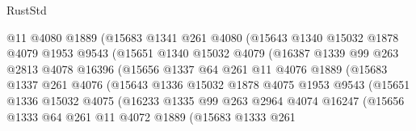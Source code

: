 \begin{lexlean}{RustStd}
\begin{coremodule}
                        @11
                        @4080
                        @1889
                        (@15683
                          @1341
                          @261
                          @4080
                          (@15643
                            @1340
                            @15032
                            @1878
                            @4079
                            @1953
                            @9543
                            (@15651
                              @1340
                              @15032
                              @4079
                              (@16387
                                @1339
                                @99
                                @263
                                @2813
                                @4078
                                @16396
                                (@15656
                                  @1337
                                  @64
                                  @261
                                  @11
                                  @4076
                                  @1889
                                  (@15683
                                    @1337
                                    @261
                                    @4076
                                    (@15643
                                      @1336
                                      @15032
                                      @1878
                                      @4075
                                      @1953
                                      @9543
                                      (@15651
                                        @1336
                                        @15032
                                        @4075
                                        (@16233
                                          @1335
                                          @99
                                          @263
                                          @2964
                                          @4074
                                          @16247
                                          (@15656
                                            @1333
                                            @64
                                            @261
                                            @11
                                            @4072
                                            @1889
                                            (@15683
                                              @1333
                                              @261

\end{coremodule}
\end{lexlean}
